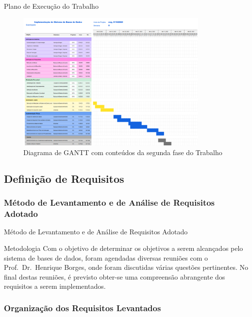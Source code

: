 \documentclass[compress,svgnames,handout,13.7pt]{beamer}
\begin{document}
\begin{frame}{Plano de Execução do Trabalho}
\begin{figure}[h]
            \centering
            \includegraphics[width=3.75in]{images/GAANT1_c2.png}
            \caption{Diagrama de GANTT com conteúdos da segunda fase do Trabalho}
        \end{figure}
\end{frame}

\subsection{Definição de Requisitos}

\subsubsection{Método de Levantamento e de Análise de Requisitos Adotado}
\begin{frame}{Método de Levantamento e de Análise de Requisitos Adotado}
\begin{block}{Metodologia}
Com o objetivo de determinar os objetivos a serem alcançados pelo sistema de bases de dados,
foram agendadas diversas reuniões com o Prof.\ Dr.\ Henrique Borges, onde foram discutidas várias
questões pertinentes. No final destas reuniões, é previsto obter-se uma compreensão abrangente
dos requisitos a serem implementados.

\end{block}
\end{frame}

\subsubsection{Organização dos Requisitos Levantados}
\end{document}
